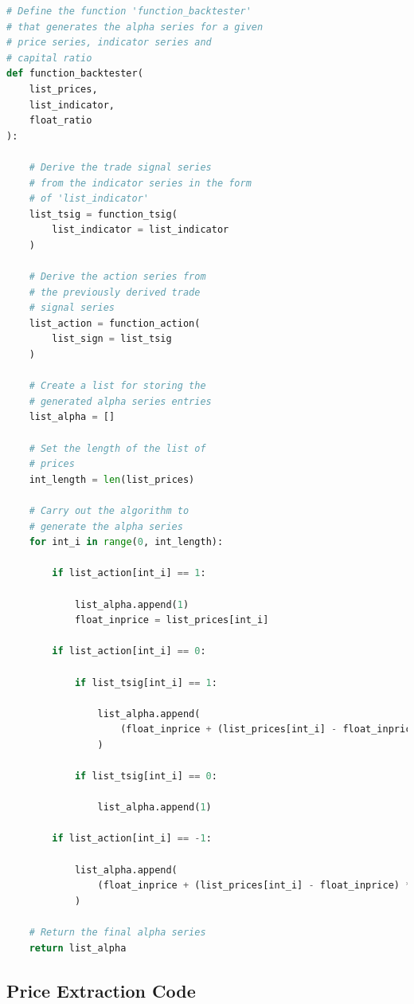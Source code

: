 \documentclass[11pt]{article}
\begin{document}
\begin{lstlisting}[language=Python]
# Define the function 'function_backtester'
# that generates the alpha series for a given
# price series, indicator series and
# capital ratio
def function_backtester(
    list_prices,
    list_indicator,
    float_ratio
):

    # Derive the trade signal series
    # from the indicator series in the form
    # of 'list_indicator'
    list_tsig = function_tsig(
        list_indicator = list_indicator
    )

    # Derive the action series from
    # the previously derived trade
    # signal series
    list_action = function_action(
        list_sign = list_tsig
    )

    # Create a list for storing the
    # generated alpha series entries
    list_alpha = []

    # Set the length of the list of
    # prices
    int_length = len(list_prices)

    # Carry out the algorithm to 
    # generate the alpha series
    for int_i in range(0, int_length):

        if list_action[int_i] == 1:

            list_alpha.append(1)
            float_inprice = list_prices[int_i]

        if list_action[int_i] == 0:

            if list_tsig[int_i] == 1:

                list_alpha.append(
                    (float_inprice + (list_prices[int_i] - float_inprice) * float_ratio) / (float_inprice + (list_prices[int_i - 1] - float_inprice) * float_ratio)
                )

            if list_tsig[int_i] == 0:

                list_alpha.append(1)

        if list_action[int_i] == -1:

            list_alpha.append(
                (float_inprice + (list_prices[int_i] - float_inprice) * float_ratio) / (float_inprice + (list_prices[int_i - 1] - float_inprice) * float_ratio)
            )

    # Return the final alpha series
    return list_alpha
\end{lstlisting}

\subsection{Price Extraction Code}
\end{document}
